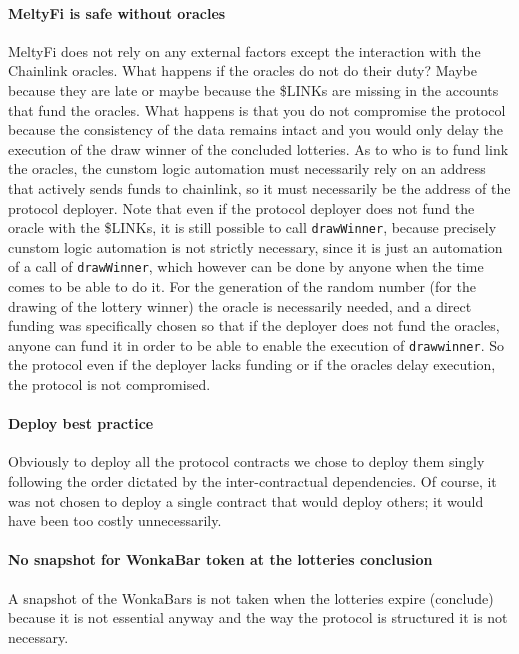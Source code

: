 \paragraph{MeltyFi is safe without oracles} 
MeltyFi does not rely on any external factors except the interaction with the Chainlink oracles. What happens if the oracles do not do their duty? Maybe because they are late or maybe because the \$LINKs are missing in the accounts that fund the oracles. What happens is that you do not compromise the protocol because the consistency of the data remains intact and you would only delay the execution of the draw winner of the concluded lotteries. As to who is to fund link the oracles, the cunstom logic automation \cite{oracleautomation} must necessarily rely on an address that actively sends funds to chainlink, so it must necessarily be the address of the protocol deployer. Note that even if the protocol deployer does not fund the oracle with the \$LINKs, it is still possible to call \texttt{drawWinner}, because precisely cunstom logic automation is not strictly necessary, since it is just an automation of a call of \texttt{drawWinner}, which however can be done by anyone when the time comes to be able to do it. For the generation of the random number (for the drawing of the lottery winner) the oracle is necessarily needed, and a direct funding \cite{oraclerandom} was specifically chosen so that if the deployer does not fund the oracles, anyone can fund it in order to be able to enable the execution of \texttt{drawwinner}. So the protocol even if the deployer lacks funding or if the oracles delay execution, the protocol is not compromised.

\paragraph{Deploy best practice}
Obviously to deploy all the protocol contracts we chose to deploy them singly following the order dictated by the inter-contractual dependencies. Of course, it was not chosen to deploy a single contract that would deploy others; it would have been too costly unnecessarily.

\paragraph{No snapshot for WonkaBar token at the lotteries conclusion}
A snapshot of the WonkaBars is not taken when the lotteries expire (conclude) because it is not essential anyway and the way the protocol is structured it is not necessary.